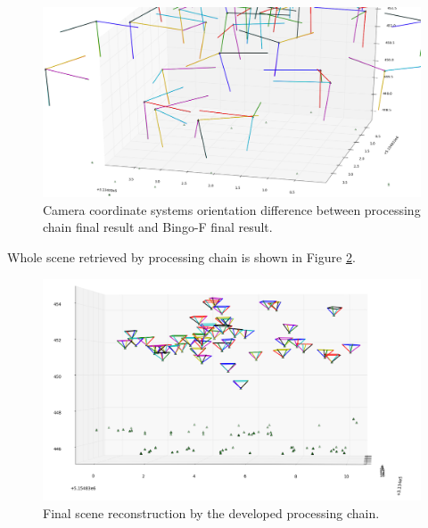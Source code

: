 \documentclass[a4paper,12pt]{article}
\begin{document}
\begin{center}
 \begin{figure}[!h]
    \includegraphics[scale=0.28]{figures/result.png}
     \caption{Camera coordinate systems orientation difference between processing chain final result and Bingo-F final result.}
    \label{fig:cam_diff}
\end{figure}
\end{center}


Whole scene retrieved by processing chain is shown in Figure \ref{fig:final_result}.

\begin{center}
 \begin{figure}[!h]
      \includegraphics[scale=0.35]{figures/result_all.png}
     \caption{Final scene reconstruction by the developed processing chain.}
    \label{fig:final_result}
\end{figure}
\end{center}

\end{document}
